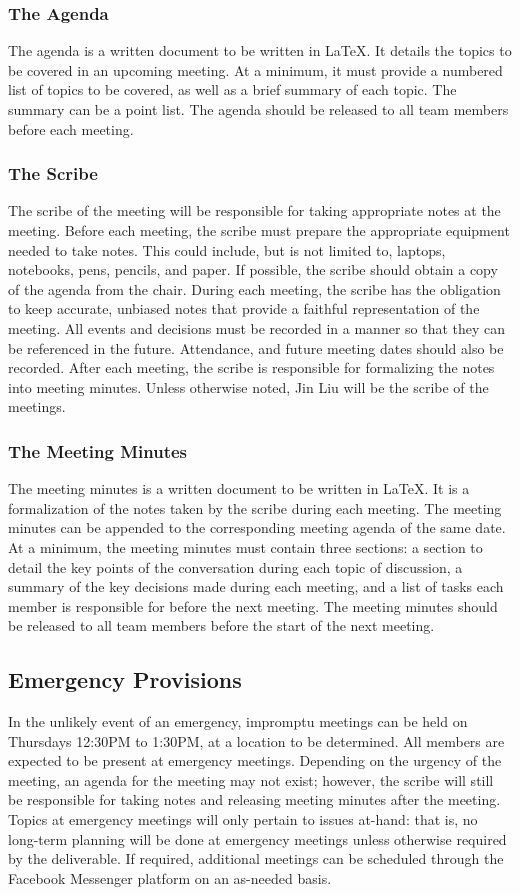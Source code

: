\documentclass{article}
\begin{document}
\subsubsection{The Agenda}
The agenda is a written document to be written in \LaTeX. It details the topics 
to be covered in an upcoming meeting. At a minimum, it must provide a numbered 
list of topics to be covered, as well as a brief summary of each topic. The 
summary can be a point list. The agenda should be released to all team members 
before each meeting.

\subsubsection{The Scribe}
The scribe of the meeting will be responsible for taking appropriate notes at 
the meeting. Before each meeting, the scribe must prepare the appropriate 
equipment needed to take notes. This could include, but is not limited to, 
laptops, notebooks, pens, pencils, and paper. If possible, the scribe should 
obtain a copy of the agenda from the chair. During each meeting, the scribe has 
the obligation to keep accurate, unbiased notes that provide a faithful 
representation of the meeting. All events and decisions must be recorded in a 
manner so that they can be referenced in the future. Attendance, and future 
meeting dates should also be recorded. After each meeting, the scribe is 
responsible for formalizing the notes into meeting minutes. Unless otherwise 
noted, Jin Liu will be the scribe of the meetings.

\subsubsection{The Meeting Minutes}
The meeting minutes is a written document to be written in \LaTeX. It is a 
formalization of the notes taken by the scribe during each meeting. The meeting 
minutes can be appended to the corresponding meeting agenda of the same date. At 
a minimum, the meeting minutes must contain three sections: a section to detail 
the key points of the conversation during each topic of discussion, a summary of 
the key decisions made during each meeting, and a list of tasks each member is 
responsible for before the next meeting. The meeting minutes should be released 
to all team members before the start of the next meeting.

\subsection{Emergency Provisions}
In the unlikely event of an emergency, impromptu meetings can be held on 
Thursdays 12:30PM to 1:30PM, at a location to be determined. All members are 
expected to be present at emergency meetings. Depending on the urgency of the 
meeting, an agenda for the meeting may not exist; however, the scribe will still 
be responsible for taking notes and releasing meeting minutes after the meeting. 
Topics at emergency meetings will only pertain to issues at-hand: that is, no 
long-term planning will be done at emergency meetings unless otherwise required 
by the deliverable. If required, additional meetings can be scheduled through 
the Facebook Messenger platform on an as-needed basis.
\end{document}

